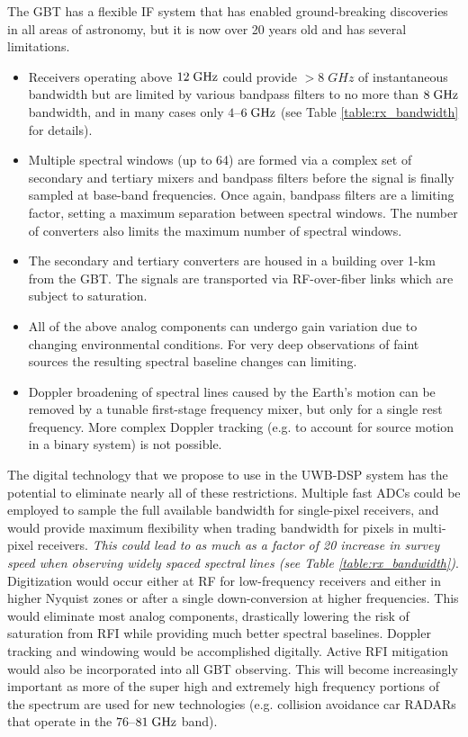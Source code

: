 \documentclass[10pt]{myNSF}
\begin{document}

The GBT has a flexible IF system that has enabled ground-breaking
discoveries in all areas of astronomy, but it is now over 20 years old
and has several limitations.
\begin{itemize}
  \item{Receivers operating above $12\; \textrm{GHz}$ could provide $>8\; GHz$
    of instantaneous bandwidth but are limited by various bandpass
    filters to no more than $8\; \textrm{GHz}$ bandwidth, and in many cases
    only $4$--$6\; \textrm{GHz}$ (see Table \ref{table:rx_bandwidth} for
    details).}
  \item{Multiple spectral windows (up to 64) are formed via a complex
    set of secondary and tertiary mixers and bandpass filters before
    the signal is finally sampled at base-band frequencies.  Once
    again, bandpass filters are a limiting factor, setting a maximum
    separation between spectral windows.  The number of converters
    also limits the maximum number of spectral windows.}
  \item{The secondary and tertiary converters are housed in a building
    over 1-km from the GBT.  The signals are transported via
    RF-over-fiber links which are subject to saturation.}
  \item{All of the above analog components can undergo gain variation
    due to changing environmental conditions.  For very deep
    observations of faint sources the resulting spectral baseline
    changes can limiting.}
  \item{Doppler broadening of spectral lines caused by the Earth's
    motion can be removed by a tunable first-stage frequency mixer,
    but only for a single rest frequency.  More complex Doppler
    tracking (e.g. to account for source motion in a binary system) is
    not possible.}
\end{itemize}

The digital technology that we propose to use in the UWB-DSP system
has the potential to eliminate nearly all of these restrictions.
Multiple fast ADCs could be employed to sample the full available
bandwidth for single-pixel receivers, and would provide maximum
flexibility when trading bandwidth for pixels in multi-pixel
receivers.  \emph{This could lead to as much as a factor of 20
  increase in survey speed when observing widely spaced spectral lines
  (see Table \ref{table:rx_bandwidth})}.  Digitization would occur
either at RF for low-frequency receivers and either in higher Nyquist
zones or after a single down-conversion at higher frequencies.  This
would eliminate most analog components, drastically lowering the risk
of saturation from RFI while providing much better spectral baselines.
Doppler tracking and windowing would be accomplished digitally.
Active RFI mitigation would also be incorporated into all GBT
observing.  This will become increasingly important as more of the
super high and extremely high frequency portions of the spectrum are
used for new technologies (e.g. collision avoidance car RADARs that
operate in the $76$--$81\; \textrm{GHz}$ band).
\end{document}
